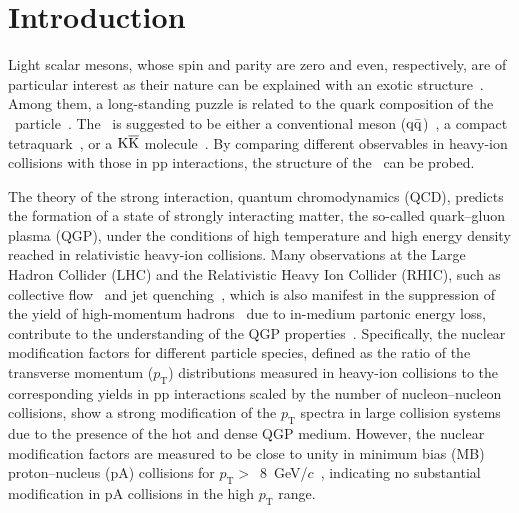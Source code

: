 
\section{Introduction}

Light scalar mesons, whose spin and parity are zero and even, respectively, are of particular interest as their nature can be explained with an exotic structure~\cite{ParticleDataGroup:2022pth}. Among them, a long-standing puzzle is related to the quark composition of the \fzero~particle~\cite{ExHIC:2010gcb, Jaffe:1976ig, Maiani:2004uc}. The \fzero~is suggested to be either a conventional meson ($\rm{}q\bar{q}$)~\cite{Chen:2003za}, a compact tetraquark~\cite{Achasov:2020aun}, or a $\rm{}K\overline{K}$ molecule~\cite{Ahmed:2020kmp}. By comparing different observables in heavy-ion collisions with those in pp interactions, the structure of the \fzero~can be probed.

The theory of the strong interaction, quantum chromodynamics (QCD), predicts the formation of a state of strongly interacting matter, the so-called quark--gluon plasma (QGP), under the conditions of high temperature and high energy density reached in relativistic heavy-ion collisions. Many observations at the Large Hadron Collider (LHC) and the Relativistic Heavy Ion Collider (RHIC), such as collective flow~\cite{Bhalerao:2020ulk, ALICE:2019zfl, Adams:2005dq, Adcox:2004mh} and jet quenching~\cite{ALICE:2019qyj, ATLAS:2010isq, PHENIX:2010nlr}, which is also manifest in the suppression of the yield of high-momentum hadrons~\cite{ALICE:2019hno, PHENIX:2006ujp} due to in-medium partonic energy loss, contribute to the understanding of the QGP properties~\cite{Heinz:2000bk, ALICE:2022wpn}. Specifically, the nuclear modification factors for different particle species, defined as the ratio of the transverse momentum ($p_{\mathrm{T}}$) distributions measured in heavy-ion collisions to the corresponding yields in pp interactions scaled by the number of nucleon--nucleon collisions, show a strong modification of the $p_{\mathrm{T}}$ spectra in large collision systems due to the presence of the hot and dense QGP medium. However, the nuclear modification factors are measured to be close to unity in minimum bias (MB) proton--nucleus (pA) collisions for $p_{\mathrm{T}}>$~8~GeV/$c$~\cite{ALICE:2016dei}, indicating no substantial modification in pA collisions in the high $p_{\mathrm{T}}$ range. 

